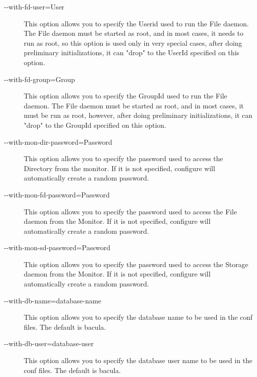 \begin{description}
\item [ {-}{-}with-fd-user=\lt{}User\gt{} ]
   This option allows you to specify the Userid used to  run the File daemon. The
   File daemon must be started as root,  and in most cases, it needs to run as
   root, so this option is  used only in very special cases,  after doing
   preliminary initializations, it can "drop"  to the UserId specified on this
   option. 

\item [ {-}{-}with-fd-group=\lt{}Group\gt{} ]
   This option allows you to specify the GroupId used to  run the File daemon.
   The File daemon must be started as root, and  in most cases, it must be run as
   root, however,  after doing preliminary initializations, it can "drop"  to
   the GroupId specified on this option. 

\item [ {-}{-}with-mon-dir-password=\lt{}Password\gt{}]
   This option allows you to specify the password used to  access the Directory
   from the monitor.  If it is not specified, configure will
   automatically create a random  password.  

\item [ {-}{-}with-mon-fd-password=\lt{}Password\gt{} ]
   This option allows you to specify the password used to  access the File daemon
   from the Monitor.  If it is not specified, configure will
   automatically create a random  password.  

\item [ {-}{-}with-mon-sd-password=\lt{}Password\gt{} ]
   This option allows you to specify the password used to  access the
   Storage daemon from the Monitor. If it is not specified, configure will
   automatically create a random  password.  

\item [ {-}{-}with-db-name=\lt{}database-name\gt{} ]
   This option allows you to specify the database name to be used in
   the conf files.  The default is bacula.

\item [ {-}{-}with-db-user=\lt{}database-user\gt{} ]
   This option allows you to specify the database user name to be used in
   the conf files.  The default is bacula.

\end{description}

